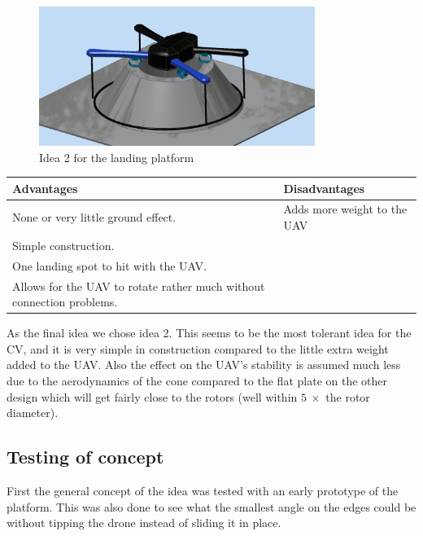 \begin{figure}
	\centering
	\includegraphics[width=0.8\textwidth]{imgs/mockup_idea_1}
	\caption{Idea 2 for the landing platform}
\end{figure}

\begin{center}
	\begin{tabular}{p{8cm} p{5cm}}
		\toprule
		\textbf{Advantages}                                                   & \textbf{Disadvantages} \\\midrule
		None or very little ground effect.                                    & Adds more weight to the UAV \\
		Simple construction.                                                  & \\
		One landing spot to hit with the UAV.                                 & \\
		Allows for the UAV to rotate rather much without connection problems. & \\\bottomrule
	\end{tabular}
\end{center}

As the final idea we chose idea 2. This seems to be the most tolerant idea for the CV, and it is very simple in construction compared to the little extra weight added to the UAV. Also the effect on the UAV's stability is assumed much less due to the aerodynamics of the cone compared to the flat plate on the other design which will get fairly close to the rotors (well within $5~ \times$ the rotor diameter).

\subsection{Testing of concept}
First the general concept of the idea was tested with an early prototype of the platform. This was also done to see what the smallest angle on the edges could be without tipping the drone instead of sliding it in place.

